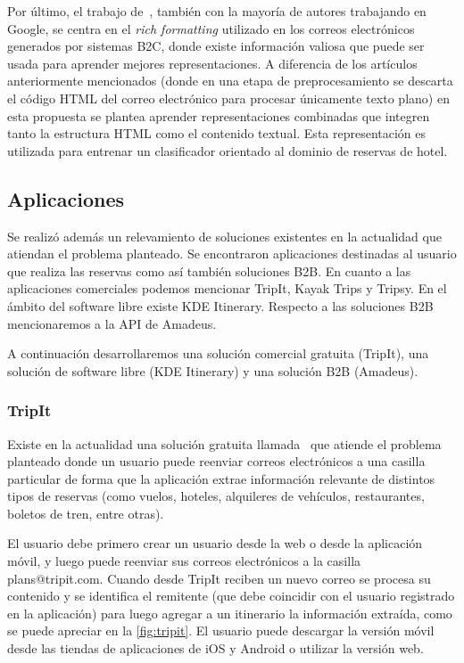 Por último, el trabajo de~\cite{Kocayusufoglu2019}, también con la mayoría de autores trabajando en Google, se centra en
el \textit{rich formatting} utilizado en los correos electrónicos generados por sistemas B2C, donde existe información
valiosa que puede ser usada para aprender mejores representaciones.
A diferencia de los artículos anteriormente mencionados (donde en una etapa de preprocesamiento se descarta el código
HTML del correo electrónico para procesar únicamente texto plano) en esta propuesta se plantea aprender representaciones
combinadas que integren tanto la estructura HTML como el contenido textual.
Esta representación es utilizada para entrenar un clasificador orientado al dominio de reservas de hotel.

\subsection{Aplicaciones}%
\label{subsec:applications}

Se realizó además un relevamiento de soluciones existentes en la actualidad que atiendan el problema planteado.
Se encontraron aplicaciones destinadas al usuario que realiza las reservas como así también soluciones B2B.
En cuanto a las aplicaciones comerciales podemos mencionar TripIt, Kayak Trips y Tripsy.
En el ámbito del software libre existe KDE Itinerary.
Respecto a las soluciones B2B mencionaremos a la API de Amadeus.

A continuación desarrollaremos una solución comercial gratuita (TripIt), una solución de software libre (KDE Itinerary)
y una solución B2B (Amadeus).

\FloatBarrier{}
\subsubsection{TripIt}

Existe en la actualidad una solución gratuita llamada~\cite{tripit-home} que atiende el problema planteado donde un
usuario puede reenviar correos electrónicos a una casilla particular de forma que la aplicación extrae información
relevante de distintos tipos de reservas (como vuelos, hoteles, alquileres de vehículos, restaurantes, boletos de tren,
entre otras).

El usuario debe primero crear un usuario desde la web o desde la aplicación móvil, y luego puede reenviar sus correos
electrónicos a la casilla plans@tripit.com.
Cuando desde TripIt reciben un nuevo correo se procesa su contenido y se identifica el remitente (que debe coincidir con
el usuario registrado en la aplicación) para luego agregar a un itinerario la información extraída, como se puede
apreciar en la \autoref{fig:tripit}.
El usuario puede descargar la versión móvil desde las tiendas de aplicaciones de iOS y Android o utilizar la versión web.

